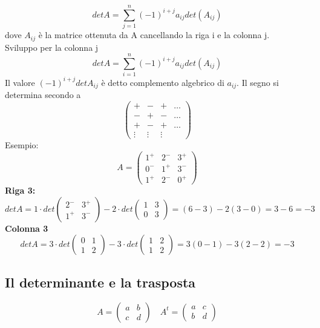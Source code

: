 \documentclass[12pt]{article}
\begin{document}
\[det A = \sum^n_{j=1} (-1)^{i+j} a_{ij} det(A_{ij})\]
dove $A_{ij}$ è la matrice ottenuta da A cancellando la riga i e la colonna j.\\
Sviluppo per la colonna j
\[det A =  \sum^n_{i=1} (-1)^{i+j} a_{ij} det(A_{ij}) \]
Il valore $(-1)^{i+j} det A_{ij}$ è detto complemento algebrico di $a_{ij}$. Il segno si determina secondo a
\[\begin{pmatrix}
    + & - & + & \dots\\
    - & + & - & \dots\\
    + & - & + & \dots\\
    \vdots & \vdots & \vdots &
\end{pmatrix}\]
Esempio:
\[A = \begin{pmatrix}
    1^+ & 2^- & 3^+\\
    0^- & 1^+ & 3^-\\
    1^+ & 2^- & 0^+
\end{pmatrix}\]
\textbf{Riga 3:}
\[det A = 1 \cdot det \begin{pmatrix}
    2^- & 3^+\\
    1^+ & 3^-
\end{pmatrix} - 2 \cdot det \begin{pmatrix}
    1 & 3\\
    0 & 3
\end{pmatrix} = (6-3) - 2(3-0) = 3-6 = -3\]
\textbf{Colonna 3}
\[det A = 3 \cdot det \begin{pmatrix}
    0 & 1\\
    1 & 2
\end{pmatrix} - 3 \cdot det \begin{pmatrix}
    1 & 2\\
    1 & 2
\end{pmatrix} = 3(0-1) - 3(2-2) =  -3\]

\subsection{Il determinante e la trasposta}

\[A = \begin{pmatrix}
    a & b\\
    c & d
\end{pmatrix} \quad A^t =\begin{pmatrix}
    a & c\\
    b & d
\end{pmatrix}\]
\end{document}
